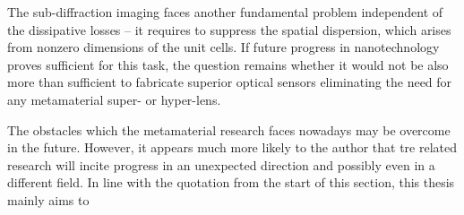The sub-diffraction imaging faces another fundamental problem independent of the dissipative losses -- it requires to suppress the spatial dispersion, which arises from nonzero dimensions of the unit cells. If future progress in nanotechnology proves sufficient for this task, the question remains whether it would not be also more than sufficient to fabricate superior optical sensors eliminating the need for any metamaterial super- or hyper-lens. 

The obstacles which the metamaterial research faces nowadays may be overcome in the future. However, it appears much more likely to the author that tre related research will incite progress in an unexpected direction and possibly even in a different field.
In line with the quotation from the start of this section, this thesis mainly aims to %



